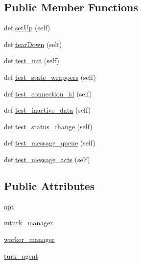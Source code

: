 \subsection*{Public Member Functions}
\begin{DoxyCompactItemize}
\item 
def \hyperlink{classparlai_1_1mturk_1_1core_1_1test_1_1test__mturk__agent_1_1TestMTurkAgent_a44bfe2c1347d96d53b880dd54abb2403}{set\+Up} (self)
\item 
def \hyperlink{classparlai_1_1mturk_1_1core_1_1test_1_1test__mturk__agent_1_1TestMTurkAgent_aa6f732df3cff0314ab13445390108e36}{tear\+Down} (self)
\item 
def \hyperlink{classparlai_1_1mturk_1_1core_1_1test_1_1test__mturk__agent_1_1TestMTurkAgent_a3b8d51776b4199c34d195cf489c4e0bd}{test\+\_\+init} (self)
\item 
def \hyperlink{classparlai_1_1mturk_1_1core_1_1test_1_1test__mturk__agent_1_1TestMTurkAgent_a043effdef469ed9c980e6decdf300c9c}{test\+\_\+state\+\_\+wrappers} (self)
\item 
def \hyperlink{classparlai_1_1mturk_1_1core_1_1test_1_1test__mturk__agent_1_1TestMTurkAgent_add6279fa053fb76a2c8b6a1710635558}{test\+\_\+connection\+\_\+id} (self)
\item 
def \hyperlink{classparlai_1_1mturk_1_1core_1_1test_1_1test__mturk__agent_1_1TestMTurkAgent_a4b06a974f692520ee9ddbb9f40a5c5bf}{test\+\_\+inactive\+\_\+data} (self)
\item 
def \hyperlink{classparlai_1_1mturk_1_1core_1_1test_1_1test__mturk__agent_1_1TestMTurkAgent_a0e2c4db2bcdb4f21f70860cf86aa2c32}{test\+\_\+status\+\_\+change} (self)
\item 
def \hyperlink{classparlai_1_1mturk_1_1core_1_1test_1_1test__mturk__agent_1_1TestMTurkAgent_aede39316eac85bcec9ad3604e6e590fe}{test\+\_\+message\+\_\+queue} (self)
\item 
def \hyperlink{classparlai_1_1mturk_1_1core_1_1test_1_1test__mturk__agent_1_1TestMTurkAgent_a29d9652d5946c84d31d1e2ecc0897d4d}{test\+\_\+message\+\_\+acts} (self)
\end{DoxyCompactItemize}
\subsection*{Public Attributes}
\begin{DoxyCompactItemize}
\item 
\hyperlink{classparlai_1_1mturk_1_1core_1_1test_1_1test__mturk__agent_1_1TestMTurkAgent_af841d6edcbc41b91de631eacecb8a70d}{opt}
\item 
\hyperlink{classparlai_1_1mturk_1_1core_1_1test_1_1test__mturk__agent_1_1TestMTurkAgent_a85629bf1aeb6c3e92b0160c2d669defb}{mturk\+\_\+manager}
\item 
\hyperlink{classparlai_1_1mturk_1_1core_1_1test_1_1test__mturk__agent_1_1TestMTurkAgent_a9791388be0406e525593d84c58da7234}{worker\+\_\+manager}
\item 
\hyperlink{classparlai_1_1mturk_1_1core_1_1test_1_1test__mturk__agent_1_1TestMTurkAgent_aa4c9b4c8ee957aa24e957ac2dcd8f3fa}{turk\+\_\+agent}
\end{DoxyCompactItemize}


